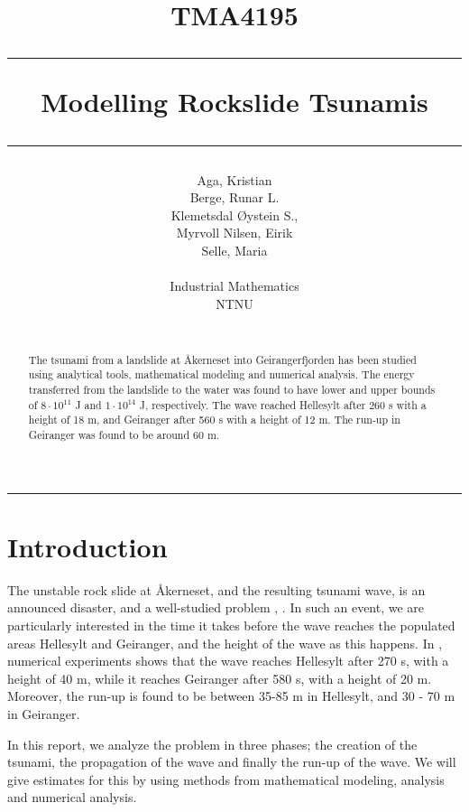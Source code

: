 \documentclass[11pt]{article}
\author{Aga, Kristian \\ Berge, Runar L. \\ Klemetsdal Øystein S.,\\
	Myrvoll Nilsen, Eirik \\ Selle, Maria\\\\
	Industrial Mathematics\\
	NTNU \\\\
}
\title{
TMA4195 \\ \vspace{5pt}
\hrule \vspace{10pt}
       {\Huge \textbf{Modelling Rockslide Tsunamis}}
\vspace{10pt}\hrule\vspace{1cm}
}
\begin{document}
\maketitle
\vspace{1cm}
\hrule
\vspace{0.5cm}
\begin{abstract}
%	
	The tsunami from a landslide at Åkerneset into Geirangerfjorden has been studied using analytical tools, mathematical modeling and
	numerical analysis. The energy transferred from the landslide to the water was found to have lower and upper bounds of $8\cdot 10^{11}$ J and $1 \cdot 10^{14}$ J,
	respectively. The wave reached Hellesylt after 260 s with a height of 18 m, and Geiranger after 560 s with a height of 12 m. The run-up in Geiranger was found to
	be around 60 m.
\end{abstract}
\thispagestyle{empty}
\clearpage
\tableofcontents
\thispagestyle{empty}
\clearpage
\setcounter{page}{1}
%
%
\section{Introduction}
The unstable rock slide at Åkerneset, and the resulting tsunami wave, is an announced disaster, and a well-studied problem \citep{harbitz14}, \citep{lothe10}. In such an event, we are particularly interested in the time it
takes before the wave reaches the populated areas Hellesylt and Geiranger, and the height of the wave as this happens. In \cite{harbitz14}, numerical experiments shows that the wave reaches Hellesylt after 270 s,
with a height of 40 m, while it reaches Geiranger after 580 s, with a height of 20 m. Moreover, the run-up is found to be between 35-85 m in Hellesylt, and 30 - 70 m in Geiranger.

In this report, we analyze the problem in three phases; the creation of the tsunami, the propagation of the wave and finally the run-up of the wave.
We will give estimates for this by using methods from mathematical modeling, analysis and numerical analysis.
\end{document}
